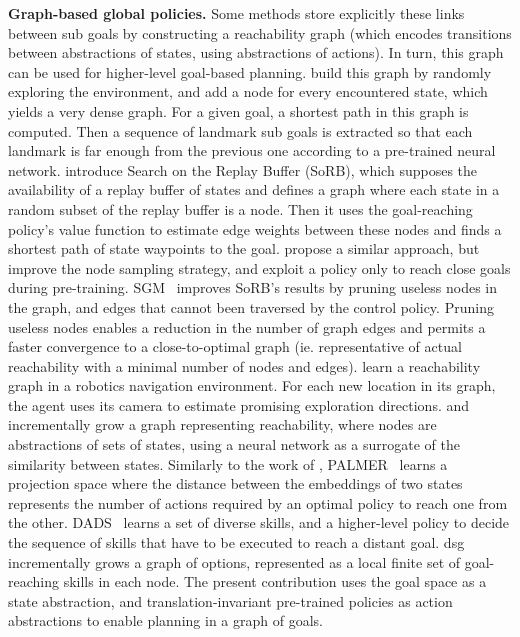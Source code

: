 \textbf{Graph-based global policies.}
Some methods store explicitly these links between sub goals by constructing a reachability graph (which encodes
transitions between abstractions of states, using abstractions of actions).
In turn, this graph can be used for higher-level goal-based planning.
\citet{savinov2018semi} build this graph by randomly exploring the environment, and add a node for every encountered
state, which yields a very dense graph.
For a given goal, a shortest path in this graph is computed.
Then a sequence of landmark sub goals is extracted so that each landmark is far enough from the previous one according
to a pre-trained neural network.
\citet{eysenbach2019search} introduce Search on the Replay Buffer (SoRB), which supposes the availability of a replay
buffer of states and defines a graph where each state in a random subset of the replay buffer is a node.
Then it uses the goal-reaching policy's value function to estimate edge weights between these nodes and finds a shortest
path of state waypoints to the goal.
\citet{huang2019mapping} propose a similar approach, but improve the node sampling strategy, and exploit a policy only
to reach close goals during pre-training.
SGM~\citep{emmons2020sparse} improves SoRB's results by pruning useless nodes in the graph, and edges that cannot been
traversed by the control policy.
Pruning useless nodes enables a reduction in the number of graph edges and permits a faster convergence to a
close-to-optimal graph (ie. representative of actual reachability with a minimal number of nodes and edges).
\citet{chaplot2020neural} learn a reachability graph in a robotics navigation environment.
For each new location in its graph, the agent uses its camera to estimate promising exploration directions.
\citet{aubret2021distop} and \citet{ruan2022target} incrementally grow a graph representing reachability, where nodes
are abstractions of sets of states, using a neural network as a surrogate of the similarity between states.
Similarly to the work of \citet{aubret2021distop}, PALMER~\citep{beker2022palmer} learns a projection space where the
distance between the embeddings of two states
represents the number of actions required by an optimal policy to reach one from the other.
DADS~\citep{sharma2019dynamics} learns a set of diverse skills, and a higher-level policy to decide the sequence of
skills that have to be executed to reach a distant goal.
\acrshort{dsg}~\citep{bagaria2021skill} incrementally grows a graph of options, represented as a local finite set of
goal-reaching skills in each node.
The present contribution uses the goal space as a state abstraction, and translation-invariant pre-trained policies as
action abstractions to enable planning in a graph of goals.


